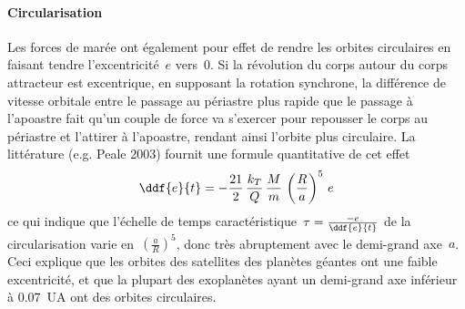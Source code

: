 \sk
\paragraph{Circularisation} Les forces de marée ont également pour effet de rendre les orbites circulaires en faisant tendre l'excentricité~$e$ vers~$0$. Si la révolution du corps autour du corps attracteur est excentrique, en supposant la rotation synchrone, la différence de vitesse orbitale entre le passage au périastre plus rapide que le passage à l'apoastre fait qu'un couple de force va s'exercer pour repousser le corps au périastre et l'attirer à l'apoastre, rendant ainsi l'orbite plus circulaire. La littérature (e.g. Peale 2003) fournit une formule quantitative de cet effet
\[ \ddf{e}{t} = - \frac{21}{2} \, \frac{k_T}{Q} \, \frac{M}{m} \, \left( \frac{R}{a} \right)^5 \, e  \]
\noindent ce qui indique que l'échelle de temps caractéristique~$\tau = \frac{-e}{\ddf{e}{t}} $ de la circularisation varie en~$\left( \frac{a}{R} \right)^5$, donc très abruptement avec le demi-grand axe~$a$. Ceci explique que les orbites des satellites des planètes géantes ont une faible excentricité, et que la plupart des exoplanètes ayant un demi-grand axe inférieur à $0.07$~UA ont des orbites circulaires.
